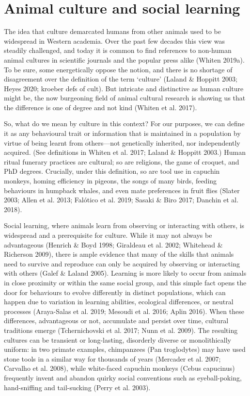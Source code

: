 \section{Animal culture and social learning }
The idea that culture demarcated humans from other animals used to be widespread in Western academia. Over the past few decades this view was steadily challenged, and today it is common to find references to non-human animal cultures in scientific journals and the popular press alike (Whiten 2019a). To be sure, some energetically oppose the notion, and there is no shortage of disagreement over the definition of the term ‘culture’ (Laland \& Hoppitt 2003; Heyes 2020; kroeber defs of cult). But intricate and distinctive as human culture might be, the now burgeoning field of animal cultural research is showing us that the difference is one of degree and not kind (Whiten et al. 2017).

So, what do we mean by culture in this context? For our purposes, we can define it as any behavioural trait or information that is maintained in a population by virtue of being learnt from others---not genetically inherited, nor independently acquired. (See definitions in Whiten et al. 2017; Laland \& Hoppitt 2003.) Human ritual funerary practices are cultural; so are religions, the game of croquet, and PhD degrees. Crucially, under this definition, so are tool use in capuchin monkeys, homing efficiency in pigeons, the songs of many birds, feeding behaviours in humpback whales, and even mate preferences in fruit flies (Slater 2003; Allen et al. 2013; Falótico et al. 2019; Sasaki \& Biro 2017; Danchin et al. 2018). 

Social learning, where animals learn from observing or interacting with others, is widespread and a prerequisite for culture. While it may not always be advantageous (Henrich \& Boyd 1998; Giraldeau et al. 2002; Whitehead \& Richerson 2009), there is ample evidence that many of the skills that animals need to survive and reproduce can only be acquired by observing or interacting with others (Galef \& Laland 2005). Learning is more likely to occur from animals in close proximity or within the same social group, and this simple fact opens the door for behaviours to evolve differently in distinct populations, which can happen due to variation in learning abilities, ecological differences, or neutral processes (Araya-Salas et al. 2019; Mesoudi et al. 2016; Aplin 2016). When these differences, advantageous or not, accumulate and persist over time, cultural traditions emerge (Tchernichovski et al. 2017; Nunn et al. 2009). The resulting cultures can be transient or long-lasting, disorderly diverse or monolithically uniform: in two primate examples, chimpanzees (Pan troglodytes) may have used stone tools in a similar way for thousands of years (Mercader et al. 2007; Carvalho et al. 2008), while white-faced capuchin monkeys (Cebus capucinus) frequently invent and abandon quirky social conventions such as eyeball-poking, hand-sniffing and tail-sucking (Perry et al. 2003). 

